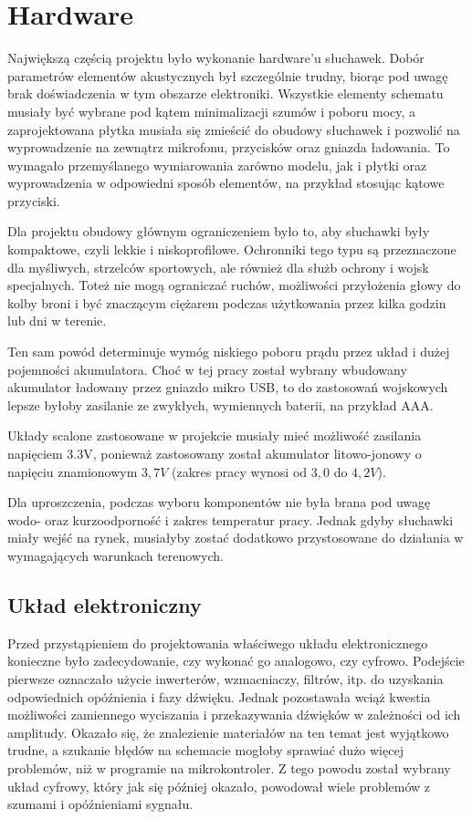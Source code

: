 \chapter{Hardware}
\label{cha:hardware}

Największą częścią projektu było wykonanie hardware'u słuchawek. Dobór parametrów elementów akustycznych był szczególnie trudny, biorąc pod uwagę brak doświadczenia w tym obszarze elektroniki. Wszystkie elementy schematu musiały być wybrane pod kątem minimalizacji szumów i poboru mocy, a zaprojektowana płytka musiała się zmieścić do obudowy słuchawek i pozwolić na wyprowadzenie na zewnątrz mikrofonu, przycisków oraz gniazda ładowania. To wymagało przemyślanego wymiarowania zarówno modelu, jak i płytki oraz wyprowadzenia w odpowiedni sposób elementów, na przykład stosując kątowe przyciski.

Dla projektu obudowy głównym ograniczeniem było to, aby słuchawki były kompaktowe, czyli lekkie i niskoprofilowe. Ochronniki tego typu są przeznaczone dla myśliwych, strzelców sportowych, ale również dla służb ochrony i wojsk specjalnych. Toteż nie mogą ograniczać ruchów, możliwości przyłożenia głowy do kolby broni i być znaczącym ciężarem podczas użytkowania przez kilka godzin lub dni w terenie.

Ten sam powód determinuje wymóg niskiego poboru prądu przez układ i dużej pojemności akumulatora. Choć w tej pracy został wybrany wbudowany akumulator ładowany przez gniazdo mikro USB, to do zastosowań wojskowych lepsze byłoby zasilanie ze zwykłych, wymiennych baterii, na przykład AAA.

Układy scalone zastosowane w projekcie musiały mieć możliwość zasilania napięciem 3.3V, ponieważ zastosowany został akumulator litowo-jonowy o napięciu znamionowym $3,7V$ (zakres pracy wynosi od $3,0$ do $4,2V$).

Dla uproszczenia, podczas wyboru komponentów nie była brana pod uwagę wodo- oraz kurzoodporność i zakres temperatur pracy. Jednak gdyby słuchawki miały wejść na rynek, musiałyby zostać dodatkowo przystosowane do działania w wymagających warunkach terenowych.


\section{Układ elektroniczny}
\label{cha:uklad}

Przed przystąpieniem do projektowania właściwego układu elektronicznego konieczne było zadecydowanie, czy wykonać go analogowo, czy cyfrowo. Podejście pierwsze oznaczało użycie inwerterów, wzmacniaczy, filtrów, itp. do uzyskania odpowiednich opóźnienia i fazy dźwięku. Jednak pozostawała wciąż kwestia możliwości zamiennego wyciszania i przekazywania dźwięków w zależności od ich amplitudy. Okazało się, że znalezienie materiałów na ten temat jest wyjątkowo trudne, a szukanie błędów na schemacie mogłoby sprawiać dużo więcej problemów, niż w programie na mikrokontroler. Z tego powodu został wybrany układ cyfrowy, który jak się później okazało, powodował wiele problemów z szumami i opóźnieniami sygnału.

